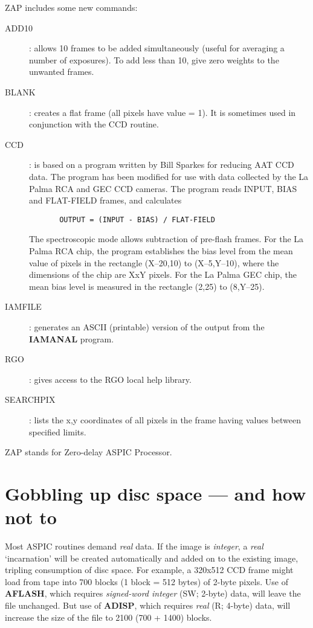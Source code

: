 ZAP includes some new commands:
\begin{description}
\begin{description}
\item [ADD10] :
allows 10 frames to be added simultaneously (useful for averaging a number of
exposures).
To add less than 10, give zero weights to the unwanted frames.
\item [BLANK] :
creates a flat frame (all pixels have value = 1).
It is sometimes used in conjunction with the CCD routine.
\item [CCD] :
is based on a program written by Bill Sparkes for reducing AAT CCD data.
The program has been modified for use with data collected by the La Palma RCA
and GEC CCD cameras.
The program reads INPUT, BIAS and FLAT-FIELD frames, and calculates
\begin{verbatim}
       OUTPUT = (INPUT - BIAS) / FLAT-FIELD
\end{verbatim}
The spectroscopic mode allows subtraction of pre-flash frames.
For the La Palma RCA chip, the program establishes the bias level from the
mean value of pixels in the rectangle (X--20,10) to (X--5,Y--10), where the
dimensions of the chip are XxY pixels.
For the La Palma GEC chip, the mean bias level is measured in the rectangle
(2,25) to (8,Y--25).
\item [IAMFILE] :
generates an ASCII (printable) version of the output from the {\bf IAMANAL}
program.
\item [RGO] :
gives access to the RGO local help library.
\item [SEARCHPIX] :
lists the x,y coordinates of all pixels in the frame having values between
specified limits.
\end{description}
\end{description}

ZAP stands for Zero-delay ASPIC Processor.

\section {Gobbling up disc space --- and how not to}

Most ASPIC routines demand {\em real} data.
If the image is {\em integer}, a {\em real} `incarnation' will be created
automatically and added on to the existing image, tripling consumption of
disc space.
For example, a 320x512 CCD frame might load from tape into 700 blocks
(1 block = 512 bytes) of 2-byte pixels.
Use of {\bf AFLASH}, which requires {\em signed-word integer} (SW; 2-byte) data,
will leave the file unchanged.
But use of {\bf ADISP}, which requires {\em real} (R; 4-byte) data, will
increase the size of the file to 2100 (700 + 1400) blocks.

